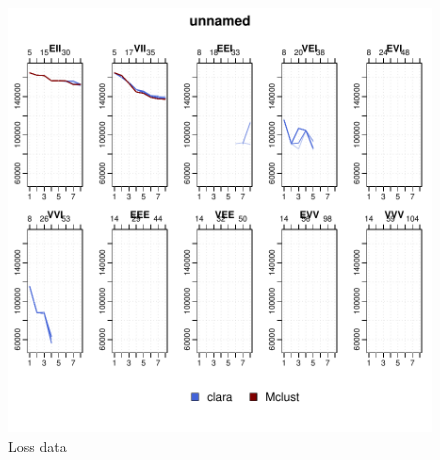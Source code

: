 \begin{figure}[h!]
    \centering
\includegraphics{chapter3-figloss}
    \caption{Loss data}
    \label{fig:loss}
\end{figure}
